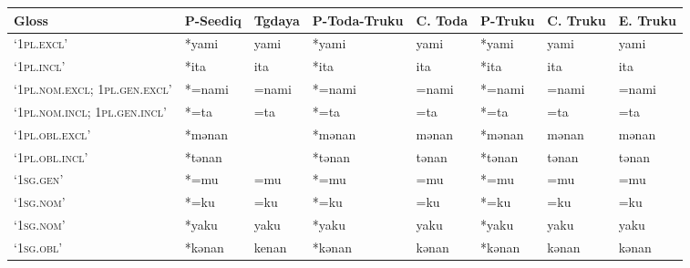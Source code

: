 \begin{landscape}    
\renewcommand{\arraystretch}{1}
\begin{longtable}[c]{@{}p{3cm}<{\raggedright}p{2.75cm}<{\raggedright}p{2.75cm}<{\raggedright}p{2.75cm}<{\raggedright}p{2.75cm}<{\raggedright}p{2.75cm}<{\raggedright}p{2.75cm}<{\raggedright}p{2.75cm}<{\raggedright}@{}}
\textbf{Gloss}   & \textbf{P-Seediq}                         & \textbf{Tgdaya}  & \textbf{P-Toda-Truku}                        & \textbf{C. Toda}  & \textbf{P-Truku}                        & \textbf{C. Truku}            & \textbf{E. Truku}                                                          \\* \midrule
\endhead
%
\endfoot
%
\endlastfoot
%
`\textsc{1pl.excl}'                   & *yami  & yami  & *yami  & yami  & *yami  & yami  & yami  \\
`\textsc{1pl.incl}'                   & *ita   & ita   & *ita   & ita   & *ita   & ita   & ita   \\
`\textsc{1pl.nom.excl; 1pl.gen.excl}' & *=nami & =nami & *=nami & =nami & *=nami & =nami & =nami \\
`\textsc{1pl.nom.incl; 1pl.gen.incl}' & *=ta   & =ta   & *=ta   & =ta   & *=ta   & =ta   & =ta   \\
`\textsc{1pl.obl.excl}'               & *mənan &       & *mənan & mənan & *mənan & mənan & mənan \\
`\textsc{1pl.obl.incl}'               & *tənan &       & *tənan & tənan & *tənan & tənan & tənan \\
`\textsc{1sg.gen}'                                   & *=mu               & =mu                            & *=mu               & =mu                        & *=mu             & =mu                      & =mu                               \\
`\textsc{1sg.nom}'                                   & *=ku               & =ku                            & *=ku               & =ku                        & *=ku             & =ku                      & =ku                               \\
`\textsc{1sg.nom}'                                   & *yaku              & yaku                           & *yaku              & yaku                       & *yaku            & yaku                     & yaku                              \\
`\textsc{1sg.obl}'                                   & *kənan             & kenan                          & *kənan             & kənan                      & *kənan           & kənan                    & kənan                             \\

\end{longtable}
\end{landscape}
